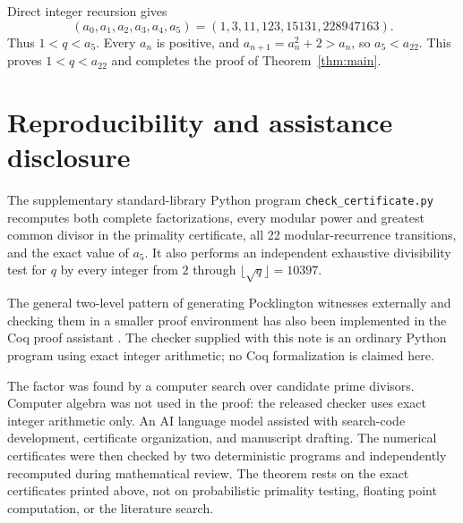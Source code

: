 \documentclass[11pt]{article}
\begin{document}
Direct integer recursion gives
\[
(a_0,a_1,a_2,a_3,a_4,a_5)
=(1,3,11,123,15131,228947163).
\]
Thus $1<q<a_5$.  Every $a_n$ is positive, and
$a_{n+1}=a_n^2+2>a_n$, so $a_5<a_{22}$.  This proves
$1<q<a_{22}$ and completes the proof of Theorem~\ref{thm:main}.

\section*{Reproducibility and assistance disclosure}

The supplementary standard-library Python program
\texttt{check\_certificate.py} recomputes both complete factorizations, every
modular power and greatest common divisor in the primality certificate, all 22
modular-recurrence transitions, and the exact value of $a_5$.  It also performs
an independent exhaustive divisibility test for $q$ by every integer from $2$
through $\lfloor\sqrt q\rfloor=10397$.

The general two-level pattern of generating Pocklington witnesses externally
and checking them in a smaller proof environment has also been implemented in
the Coq proof assistant \cite{GregoireTheryWerner2006}.  The checker supplied
with this note is an ordinary Python program using exact integer arithmetic;
no Coq formalization is claimed here.

The factor was found by a computer search over candidate prime divisors.
Computer algebra was not used in the proof: the released checker uses exact
integer arithmetic only.  An AI language model assisted with search-code
development, certificate organization, and manuscript drafting.  The numerical
certificates were then checked by two deterministic programs and independently
recomputed during mathematical review.  The theorem rests on the exact
certificates printed above, not on probabilistic primality testing, floating
point computation, or the literature search.



\end{document}
